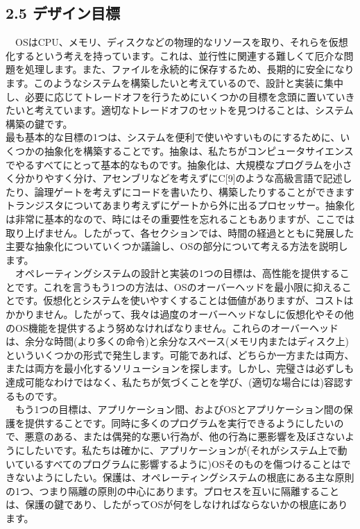 \hypertarget{ux30c7ux30b6ux30a4ux30f3ux76eeux6a19}{%
\subsection*{2.5
デザイン目標}\label{ux30c7ux30b6ux30a4ux30f3ux76eeux6a19}}

　OSはCPU、メモリ、ディスクなどの物理的なリソースを取り、それらを仮想化するという考えを持っています。これは、並行性に関連する難しくて厄介な問題を処理します。また、ファイルを永続的に保存するため、長期的に安全になります。このようなシステムを構築したいと考えているので、設計と実装に集中し、必要に応じてトレードオフを行うためにいくつかの目標を念頭に置いていきたいと考えています。適切なトレードオフのセットを見つけることは、システム構築の鍵です。\\
最も基本的な目標の1つは、システムを便利で使いやすいものにするために、いくつかの抽象化を構築することです。抽象は、私たちがコンピュータサイエンスでやるすべてにとって基本的なものです。抽象化は、大規模なプログラムを小さく分かりやすく分け、アセンブリなどを考えずにC{[}9{]}のような高級言語で記述したり、論理ゲートを考えずにコードを書いたり、構築したりすることができますトランジスタについてあまり考えずにゲートから外に出るプロセッサー。抽象化は非常に基本的なので、時にはその重要性を忘れることもありますが、ここでは取り上げません。したがって、各セクションでは、時間の経過とともに発展した主要な抽象化についていくつか議論し、OSの部分について考える方法を説明します。\\
　オペレーティングシステムの設計と実装の1つの目標は、高性能を提供することです。これを言うもう1つの方法は、OSのオーバーヘッドを最小限に抑えることです。仮想化とシステムを使いやすくすることは価値がありますが、コストはかかりません。したがって、我々は過度のオーバーヘッドなしに仮想化やその他のOS機能を提供するよう努めなければなりません。これらのオーバーヘッドは、余分な時間(より多くの命令)と余分なスペース(メモリ内またはディスク上)といういくつかの形式で発生します。可能であれば、どちらか一方または両方、または両方を最小化するソリューションを探します。しかし、完璧さは必ずしも達成可能なわけではなく、私たちが気づくことを学び、(適切な場合には)容認するものです。\\
　もう1つの目標は、アプリケーション間、およびOSとアプリケーション間の保護を提供することです。同時に多くのプログラムを実行できるようにしたいので、悪意のある、または偶発的な悪い行為が、他の行為に悪影響を及ぼさないようにしたいです。私たちは確かに、アプリケーションが(それがシステム上で動いているすべてのプログラムに影響するように)OSそのものを傷つけることはできないようにしたい。保護は、オペレーティングシステムの根底にある主な原則の1つ、つまり隔離の原則の中心にあります。プロセスを互いに隔離することは、保護の鍵であり、したがってOSが何をしなければならないかの根底にあります。\\
